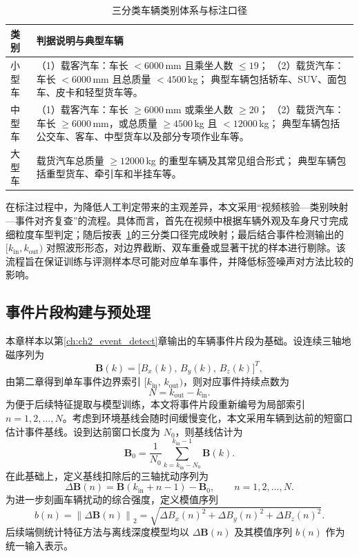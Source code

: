 \documentclass{xdupgthesis}
\begin{document}
\begin{table}[!htbp]
\centering
\small
\caption{三分类车辆类别体系与标注口径}
\label{tab:ch3_label_rule}
\renewcommand{\arraystretch}{1.25}
\setlength{\tabcolsep}{4pt}
\begin{tabular}{p{2.0cm} p{10.8cm}}
\hline
类别 & 判据说明与典型车辆 \\
\hline
小型车 &
（1）载客汽车：车长 $<6000$\,mm 且乘坐人数 $\le 19$；
（2）载货汽车：车长 $<6000$\,mm 且总质量 $<4500$\,kg；
典型车辆包括轿车、SUV、面包车、皮卡和轻型货车等。\\
中型车 &
（1）载客汽车：车长 $\ge 6000$\,mm 或乘坐人数 $\ge 20$；
（2）载货汽车：车长 $\ge 6000$\,mm，或总质量 $\ge 4500$\,kg 且 $<12000$\,kg；
典型车辆包括公交车、客车、中型货车以及部分专项作业车等。\\
大型车 &
载货汽车总质量 $\ge 12000$\,kg 的重型车辆及其常见组合形式；
典型车辆包括重型货车、牵引车和半挂车等。\\
\hline
\end{tabular}
\end{table}

在标注过程中，为降低人工判定带来的主观差异，本文采用“视频核验—类别映射—事件对齐复查”的流程。具体而言，首先在视频中根据车辆外观及车身尺寸完成细粒度车型判定；随后按表~\ref{tab:ch3_label_rule}的三分类口径完成映射；最后结合事件检测输出的 $[k_{\mathrm{in}},k_{\mathrm{out}})$ 对照波形形态，对边界截断、双车重叠或显著干扰的样本进行剔除。该流程旨在保证训练与评测样本尽可能对应单车事件，并降低标签噪声对方法比较的影响。

\subsection{事件片段构建与预处理}
\label{subsec:ch3_slice_interface}

本章样本以第\ref{ch:ch2_event_detect}章输出的车辆事件片段为基础。设连续三轴地磁序列为
\begin{equation}
    \mathbf{B}(k)=\big[B_x(k),\,B_y(k),\,B_z(k)\big]^T,
\end{equation}
由第二章得到单车事件边界索引 $[k_{\mathrm{in}},\,k_{\mathrm{out}})$，则对应事件持续点数为
\begin{equation}
    N=k_{\mathrm{out}}-k_{\mathrm{in}}.
\end{equation}
为便于后续特征提取与模型训练，本文将事件片段重新编号为局部索引 $n=1,2,\ldots,N$。考虑到环境基线会随时间缓慢变化，本文采用车辆到达前的短窗口估计事件基线。设到达前窗口长度为 $N_0$，则基线估计为
\begin{equation}
    \mathbf{B}_0=\frac{1}{N_0}\sum_{k=k_{\mathrm{in}}-N_0}^{k_{\mathrm{in}}-1}\mathbf{B}(k).
\end{equation}
在此基础上，定义基线扣除后的三轴扰动序列为
\begin{equation}
    \Delta\mathbf{B}(n)=\mathbf{B}(k_{\mathrm{in}}+n-1)-\mathbf{B}_0,\qquad n=1,2,\ldots,N.
\end{equation}
为进一步刻画车辆扰动的综合强度，定义模值序列
\begin{equation}
    b(n)=\left\|\Delta\mathbf{B}(n)\right\|_2
    =\sqrt{\Delta B_x(n)^2+\Delta B_y(n)^2+\Delta B_z(n)^2}.
\end{equation}
后续端侧统计特征方法与离线深度模型均以 $\Delta\mathbf{B}(n)$ 及其模值序列 $b(n)$ 作为统一输入表示。
\end{document}
